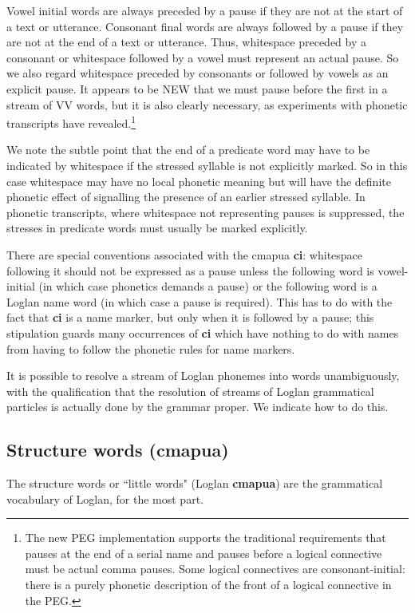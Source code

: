 \documentclass[12pt]{book}
\begin{document}
Vowel initial words are always preceded by a pause if they are not at the start of a text or utterance.  Consonant final words are always followed by a pause if they are not at the end of a text or utterance.  Thus, whitespace preceded by a consonant or whitespace followed by a vowel must represent an actual pause.  So we also regard whitespace preceded by consonants or followed by vowels
as an explicit pause.  It appears to be NEW that we must pause before the first in a stream of VV words, but it is also clearly necessary, as experiments with phonetic transcripts have revealed.\footnote{The new PEG implementation supports the traditional requirements
that pauses at the end of a serial name and pauses before a logical connective must be actual comma pauses.  Some logical connectives are consonant-initial:  there is a purely phonetic description of the front of a logical connective in the PEG.}

We note the subtle point that the end of a predicate word may have to be indicated by whitespace if the stressed syllable is not explicitly marked.  So in this case whitespace may have no local phonetic meaning but will have the definite phonetic effect of signalling the presence of an earlier stressed syllable.  In phonetic transcripts, where whitespace not representing  pauses is suppressed, the stresses in predicate words must usually be marked explicitly.

There are special conventions associated with the cmapua {\bf ci}:  whitespace following it should not be expressed as a pause unless the following word is vowel-initial (in which case phonetics demands a pause) or the following word is a Loglan name word (in which case a pause is required).  This has to do with the fact that {\bf ci} is a name marker, but only when it is followed by a pause; this stipulation guards many occurrences of {\bf ci} which have nothing to do with names from having to follow the phonetic rules for name markers.

It is possible to resolve a stream of Loglan phonemes into words unambiguously, with the qualification that the resolution of streams of Loglan grammatical particles is actually done by the grammar proper.  We indicate how to do this.

\subsection{Structure words (cmapua)}

The structure words or ``little words" (Loglan {\bf cmapua}) are the grammatical vocabulary of Loglan, for the most part.
\end{document}
